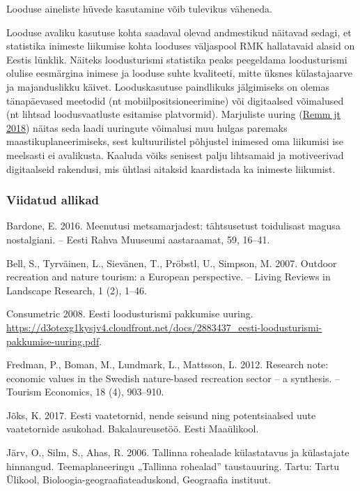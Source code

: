 \documentclass[estonian,]{article}
\begin{document}
\begin{blockquote-left}
Looduse aineliste hüvede kasutamine võib tulevikus väheneda.
\end{blockquote-left}

Looduse avaliku kasutuse kohta saadaval olevad andmestikud näitavad sedagi, et statistika inimeste liikumise kohta looduses väljaspool RMK hallatavaid alasid on Eestis lünklik. Näiteks loodusturismi statistika peaks peegeldama loodusturismi olulise eesmärgina inimese ja looduse suhte kvaliteeti, mitte üksnes külastajaarve ja majanduslikku käivet. Looduskasutuse paindlikuks jälgimiseks on olemas tänapäevased meetodid (nt mobiilpositsioneerimine) või digitaalsed võimalused (nt lihtsad loodusvaatluste esitamise platvormid). Marjuliste uuring (\protect\hyperlink{Remm2018}{Remm jt 2018}) näitas seda laadi uuringute võimalusi muu hulgas paremaks maastikuplaneerimiseks, sest kultuurilistel põhjustel inimesed oma liikumisi ise meelsasti ei avalikusta. Kaaluda võiks senisest palju lihtsamaid ja motiveerivad digitaalseid rakendusi, mis ühtlasi aitaksid kaardistada ka inimeste liikumist.

\hypertarget{viidatud-allikad-12}{%
\subsubsection*{Viidatud allikad}\label{viidatud-allikad-12}}

Bardone, E. 2016. Meenutusi metsamarjadest: tähtsusetust toidulisast magusa nostalgiani. -- Eesti Rahva Muuseumi aastaraamat, 59, 16--41.

Bell, S., Tyrväinen, L., Sievänen, T., Pröbstl, U., Simpson, M. 2007. Outdoor recreation and nature tourism: a European perspective. -- Living Reviews in Landscape Research, 1 (2), 1--46.

Consumetric 2008. Eesti loodusturismi pakkumise uuring. \url{https://d3otexg1kysjv4.cloudfront.net/docs/2883437_eesti-loodusturismi-pakkumise-uuring.pdf}.

Fredman, P., Boman, M., Lundmark, L., Mattsson, L. 2012. Research note: economic values in the Swedish nature-based recreation sector -- a synthesis. -- Tourism Economics, 18 (4), 903--910.

Jõks, K. 2017. Eesti vaatetornid, nende seisund ning potentsiaalsed uute vaatetornide asukohad. Bakalaureusetöö. Eesti Maaülikool.

Järv, O., Silm, S., Ahas, R. 2006. Tallinna rohealade külastatavus ja külastajate hinnangud. Teemaplaneeringu „Tallinna rohealad'' taustauuring. Tartu: Tartu Ülikool, Bioloogia-geograafiateaduskond, Geograafia instituut.
\end{document}
